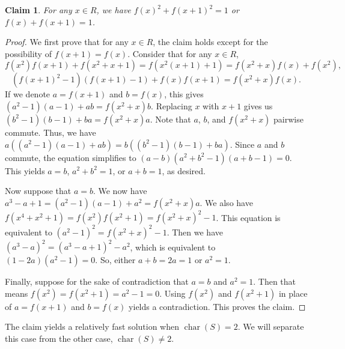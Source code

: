 \documentclass{article}
\DeclareMathOperator{\rchar}{char}
\newtheorem*{claim}{Claim}
\begin{document}
\begin{claim}
For any $x \in R$, we have $f(x)^2 + f(x + 1)^2 = 1$ or $f(x) + f(x + 1) = 1$.
\end{claim}
\begin{proof}
We first prove that for any $x \in R$, the claim holds except for the possibility of $f(x + 1) = f(x)$.
Consider that for any $x \in R$,
\[ f(x^2) f(x + 1) + f(x^2 + x + 1) = f(x^2 (x + 1) + 1) = f(x^2 + x) f(x) + f(x^2), \]
\[ (f(x + 1)^2 - 1) (f(x + 1) - 1) + f(x) f(x + 1) = f(x^2 + x) f(x). \]
If we denote $a = f(x + 1)$ and $b = f(x)$, this gives $(a^2 - 1)(a - 1) + ab = f(x^2 + x) b$.
Replacing $x$ with $x + 1$ gives us $(b^2 - 1)(b - 1) + ba = f(x^2 + x) a$.
Note that $a$, $b$, and $f(x^2 + x)$ pairwise commute.
Thus, we have $a((a^2 - 1)(a - 1) + ab) = b((b^2 - 1)(b - 1) + ba)$.
Since $a$ and $b$ commute, the equation simplifies to $(a - b)(a^2 + b^2 - 1)(a + b - 1) = 0$.
This yields $a = b$, $a^2 + b^2 = 1$, or $a + b = 1$, as desired.

Now suppose that $a = b$.
We now have $a^3 - a + 1 = (a^2 - 1)(a - 1) + a^2 = f(x^2 + x) a$.
We also have $f(x^4 + x^2 + 1) = f(x^2) f(x^2 + 1) = f(x^2 + x)^2 - 1$.
This equation is equivalent to $(a^2 - 1)^2 = f(x^2 + x)^2 - 1$.
Then we have $(a^3 - a)^2 = (a^3 - a + 1)^2 - a^2$, which is equivalent to $(1 - 2a)(a^2 - 1) = 0$.
So, either $a + b = 2a = 1$ or $a^2 = 1$.

Finally, suppose for the sake of contradiction that $a = b$ and $a^2 = 1$.
Then that means $f(x^2) = f(x^2 + 1) = a^2 - 1 = 0$.
Using $f(x^2)$ and $f(x^2 + 1)$ in place of $a = f(x + 1)$ and $b = f(x)$ yields a contradiction.
This proves the claim.
\end{proof}

The claim yields a relatively fast solution when $\rchar(S) = 2$.
We will separate this case from the other case, $\rchar(S) \neq 2$.
\end{document}
